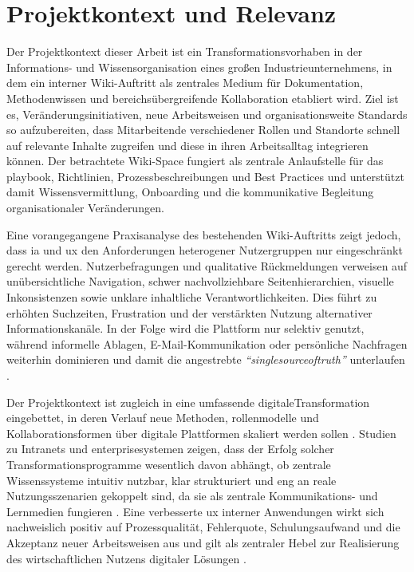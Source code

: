 \section{Projektkontext und Relevanz}
\label{sec:01-02_project-context}

Der Projektkontext dieser Arbeit ist ein Transformationsvorhaben in der Informations- und Wissensorganisation eines großen Industrieunternehmens, in dem ein interner Wiki-Auftritt als zentrales Medium für Dokumentation, Methodenwissen und bereichsübergreifende Kollaboration etabliert wird. Ziel ist es, Veränderungsinitiativen, neue Arbeitsweisen und organisationsweite Standards so aufzubereiten, dass Mitarbeitende verschiedener Rollen und Standorte schnell auf relevante Inhalte zugreifen und diese in ihren Arbeitsalltag integrieren können.
Der betrachtete Wiki-Space fungiert als zentrale Anlaufstelle für das \Gls{playbook}, Richtlinien, Prozessbeschreibungen und Best Practices und unterstützt damit Wissensvermittlung, Onboarding und die kommunikative Begleitung organisationaler Veränderungen.

Eine vorangegangene Praxisanalyse des bestehenden Wiki-Auftritts zeigt jedoch, dass \Gls{ia} und \Gls{ux} den Anforderungen heterogener Nutzergruppen nur eingeschränkt gerecht werden. Nutzerbefragungen und qualitative Rückmeldungen verweisen auf unübersichtliche Navigation, schwer nachvollziehbare Seitenhierarchien, visuelle Inkonsistenzen sowie unklare inhaltliche Verantwortlichkeiten. Dies führt zu erhöhten Suchzeiten, Frustration und der verstärkten Nutzung alternativer Informationskanäle. In der Folge wird die Plattform nur selektiv genutzt, während informelle Ablagen, E-Mail-Kommunikation oder persönliche Nachfragen weiterhin dominieren und damit die angestrebte \textit{\enquote{\Gls{singlesourceoftruth}}} unterlaufen \cite{303:Rosenfeld2015}.

Der Projektkontext ist zugleich in eine umfassende \gls{digitaleTransformation} eingebettet, in deren Verlauf neue Methoden, \Gls{rollenmodelle} und Kollaborationsformen über digitale Plattformen skaliert werden sollen \cite{302:GSMA2024}. Studien zu Intranets und \Gls{enterprisesystem}en zeigen, dass der Erfolg solcher Transformationsprogramme wesentlich davon abhängt, ob zentrale Wissenssysteme intuitiv nutzbar, klar strukturiert und eng an reale Nutzungsszenarien gekoppelt sind, da sie als zentrale Kommunikations- und Lernmedien fungieren \cite{300:FraunhoferIESE2018,303:Rosenfeld2015}. Eine verbesserte \Gls{ux} interner Anwendungen wirkt sich nachweislich positiv auf Prozessqualität, Fehlerquote, Schulungsaufwand und die Akzeptanz neuer Arbeitsweisen aus und gilt als zentraler Hebel zur Realisierung des wirtschaftlichen Nutzens digitaler Lösungen \cite{300:FraunhoferIESE2018,301:Infragistics2015}.

